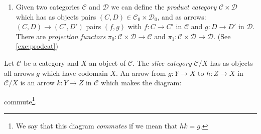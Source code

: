 \documentclass[11pt]{article}
\theoremstyle{plain}
\theoremstyle{definition}
\theoremstyle{remark}
\newcommand{\cC}{\mathcal{C}}
\newcommand{\cD}{\mathcal{D}}
\begin{document}
\begin{examples}
\begin{enumerate}
    \item Given two categories $\cC$ and $\cD$ we can define the {\em
    product
    category} $\cC \times \cD$ which has as objects pairs $(C,D) \in
    \cC_{0}
    \times \cD_{0}$, and as arrows: $(C,D) \rightarrow (C',D')$ pairs
    $(f,g)$
    with $f:C \rightarrow C'$ in $\cC$ and $g:D \rightarrow D'$ in $\cD$.
    There are {\em projection functors} 
    $\pi_{0}:\cC \times \cD \rightarrow \cC$ and 
    $\pi_{1}:\cC \times \cD \rightarrow \cD$. (See \autoref{exc:prodcat})
   \end{enumerate}
   
\end{examples}

\begin{definition} \label{def:slicecat}
    Let $\cC$ be a category and $X$ an object of $\cC$. The {\em slice
    category} $\cC/X$ has as objects all arrows $g$ which have codomain
    $X$. An arrow from $g:Y \rightarrow X$ to $h:Z \rightarrow X$ in
    $\cC/X$ 
    is an arrow $k:Y \rightarrow Z$ in $\cC$ which makes the diagram: 
    \begin{figure}[H]
       \centering
         \label{fig:my_label}
    \end{figure}
    commute\footnote{ We say that this diagram {\em commutes} if we mean that
    $hk=g$.}.
\end{definition}
\end{document}
